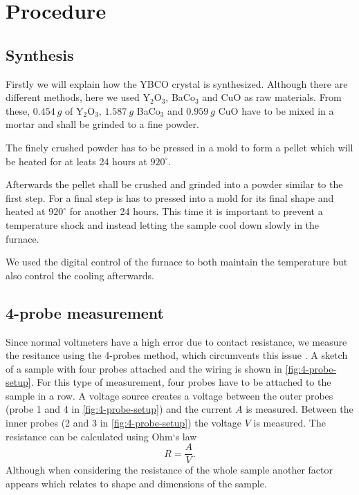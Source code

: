 \section{Procedure}
\label{sec:procedure}

\subsection{Synthesis}
\label{sec:synthesis}
Firstly we will explain how the YBCO crystal is synthesized. Although there are different methods,
here we used Y$_2$O$_3$, BaCo$_3$ and CuO as raw materials. From these, $\SI{0.454}{g}$ of
Y$_2$O$_3$, $\SI{1.587}{g}$ BaCo$_3$ and $\SI{0.959}{g}$ CuO have to be mixed in a mortar and shall
be grinded to a fine powder.

The finely crushed powder has to be pressed in a mold to form a pellet which will be heated for at
leats 24 hours at $920^\circ$.

Afterwards the pellet shall be crushed and grinded into a powder similar to the first step. For a
final step is has to pressed into a mold for its final shape and heated at $920^\circ$ for another
24 hours. This time it is important to prevent a temperature shock and instead letting the sample
cool down slowly in the furnace. 

We used the digital control of the furnace to both maintain the
temperature but also control the cooling afterwards.

\subsection{4-probe measurement}
\label{sec:4-probe measurement}
Since normal voltmeters have a high error due to contact resistance, we measure the
resitance using the 4-probes method, which circumvents this issue
\cite{Hofmann_2009,https://doi.org/10.1002/j.1538-7305.1958.tb03883.x}. A sketch of a sample with
four probes attached and the wiring is shown in \autoref{fig:4-probe-setup}. For this type of
measurement, four probes have to be attached to the sample in a row. A voltage source creates a
voltage between the outer probes (probe 1 and 4 in \autoref{fig:4-probe-setup}) and the current $A$ is
measured. Between the inner probes (2 and 3 in \autoref{fig:4-probe-setup}) the voltage $V$ is measured.
The resistance can be calculated using Ohm`s law
\begin{equation}
  R = \frac{A}{V}.
\end{equation}
Although when considering the resistance of the whole sample another factor appears which relates to
shape and dimensions of the sample.


